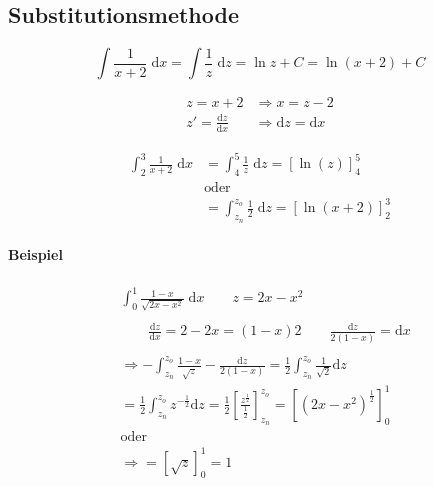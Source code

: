 \subsection{Substitutionsmethode}

\[
	\int \frac{1}{x+2} \;\mathrm{d}x = \int \frac{1}{z} \;\mathrm{d}z = \ln z + C = \ln (x+2) + C
\]

\begin{align*}
	z = x + 2                            & \Rightarrow x = z - 2                 \\
	z' = \frac{\mathrm{d}z}{\mathrm{d}x} & \Rightarrow \mathrm{d}z = \mathrm{d}x
\end{align*}

\begin{align*}
	\int_2^3 \frac{1}{x+2} \;\mathrm{d}x & = \int_4^5 \frac{1}{z} \;\mathrm{d}z = {[\ln(z)]}_4^5           \\
	                                     & \text{oder}                                                     \\
	                                     & = \int_{z_n}^{z_o} \frac{1}{2} \;\mathrm{d}z = {[\ln(x+2)]}_2^3
\end{align*}

\paragraph{Beispiel}

\begin{align*}
	 & \int_0^1 \frac{1-x}{\sqrt{2x-x^2}} \;\mathrm{d}x
	\qquad z = 2x - x^2                                                                 \\
	\\
	 & \qquad \frac{\mathrm{d}z}{\mathrm{d}x} = 2 - 2x = (1-x)2
	\qquad \frac{\mathrm{d}z}{2(1-x)} = \mathrm{d}x                                     \\
	\\
	 & \Rightarrow - \int_{z_n}^{z_o} \frac{1-x}{\sqrt{z}} - \frac{\mathrm{d}z}{2(1-x)}
	= \frac{1}{2} \int_{z_n}^{z_o} \frac{1}{\sqrt{2}} \mathrm{d}z                       \\
	 & = \frac{1}{2} \int_{z_n}^{z_o} z^{-\frac{1}{2}} \mathrm{d}z
	= \frac{1}{2} {\left[ \frac{z^{\frac{1}{2}}}{\frac{1}{2}} \right]}_{z_n}^{z_o}
	= {\left[ {\left( 2x-x^2 \right)}^\frac{1}{2} \right]}_0^1                          \\
	 & \text{oder}                                                                      \\
	 & \Rightarrow = {\left[ \sqrt{z} \right]}_0^1 = 1
\end{align*}
